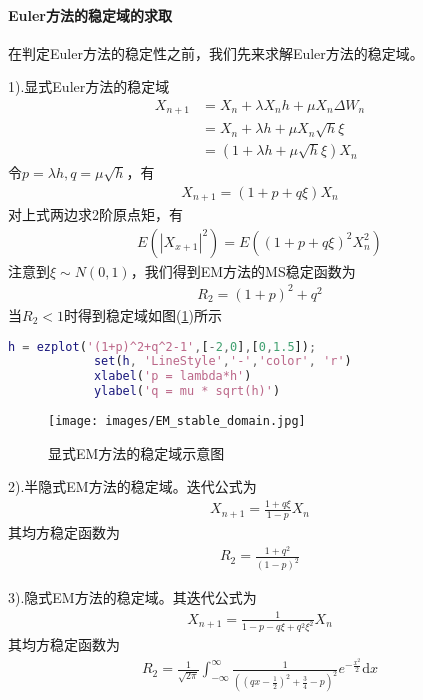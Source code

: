             \paragraph{Euler方法的稳定域的求取}
            在判定Euler方法的稳定性之前，我们先来求解Euler方法的稳定域。
            \par
            1).显式Euler方法的稳定域
            \begin{align*}
                X_{n+1} &= X_n + \lambda X_n h + \mu X_n \Delta W_n\\
                &=X_n + \lambda h + \mu X_n\sqrt{h}\xi\\
                &=(1+\lambda h +\mu \sqrt{h}\xi)X_n
            \end{align*}
            令$p = \lambda h,q = \mu \sqrt{h}$，有
            \begin{align*}
            X_{n+1} = (1 + p+ q\xi)X_n
            \end{align*}
            对上式两边求2阶原点矩，有
            \begin{align*}
                E(|X_{x+1}|^2) = E \left( (1+p+q\xi)^2X_n ^2\right)
            \end{align*}
            注意到$\xi \sim N(0,1)$，我们得到EM方法的MS稳定函数为
            \begin{align*}
                R_2 = (1+p)^2 +q^2
            \end{align*}
            当$R_2<1$时得到稳定域如图(\ref{fig:显式EM方法的稳定域示意图})所示
            \begin{lstlisting}[language = Matlab]
            h = ezplot('(1+p)^2+q^2-1',[-2,0],[0,1.5]);
            set(h, 'LineStyle','-','color', 'r')
            xlabel('p = lambda*h')
            ylabel('q = mu * sqrt(h)')
            \end{lstlisting}
           \begin{figure}[H]
           \centering
           \texttt{[image: images/EM\_stable\_domain.jpg]}
           \caption{显式EM方法的稳定域示意图}
           \label{fig:显式EM方法的稳定域示意图}
           \end{figure}
            \par
            2).半隐式EM方法的稳定域。迭代公式为
            \begin{align*}
            X_{n+1}=\frac{1+q\xi}{1-p}X_n
            \end{align*}
            其均方稳定函数为
            \begin{align*}
            R_2 = \frac{1+q^2}{(1-p)^2}
            \end{align*}
            \par
            3).隐式EM方法的稳定域。其迭代公式为
            \begin{align*}
            X_{n+1} = \frac{1}{1-p-q\xi + q^2 \xi^2} X_n
            \end{align*}
            其均方稳定函数为
            \begin{align*}
            R_2 = \frac{1}{\sqrt{2\pi}}\int_{- \infty}^{\infty}\frac{1}{( ( qx - \frac 12 )^2 +\frac {3}{4} - p )^2 } e^{-\frac{x^2}{2}}\mathrm{d}x
            \end{align*}

